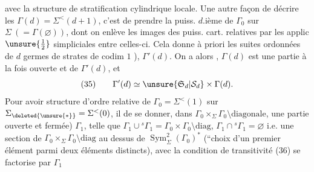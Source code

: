 avec la structure de stratification cylindrique 
locale.  Une autre façon de
décrire les $\Gamma(d)=\Sigma^{<}(d+1)$, c'est de
prendre la puiss.   $d$.ième de $\Gamma_0$\deleted{\unsure{$(\varnothing)$}}
sur $\Sigma\ (=\Gamma(\varnothing))$, dont on enlève les images
des puiss. cart. relatives   par les applic
$\unsure{\tfrac12}$ simpliciales entre celles-ci. Cela donne à priori
les  suites ordonnées de $d$ germes de
strates de codim $1$   ), 
$\Gamma'(d)$. On a alors ,
$\Gamma(d)$ est une partie à la fois ouverte et
 de $\Gamma'(d)$, et 
\[
(35)\qquad \Gamma'(d)\simeq\unsure{\mathfrak S_d|\mathcal S_d}\times\Gamma(d).
\]
Pour avoir  structure d'ordre  relative de
 $\Gamma_0=\Sigma^{<}(1)$ sur $\Sigma_{\deleted{\unsure{*}}}=\Sigma^{<}(0)$, il 
de se donner,  dans
$\Gamma_0\times_\Sigma\Gamma_0\setminus\text{diagonale}$, une partie  ouverte et fermée)
$\Gamma_1$, telle que $\Gamma_1\cup{}^s\Gamma_1=\Gamma_0\times\Gamma_0\setminus\text{diag}$, $\Gamma_1\cap{}^s\Gamma_1=\varnothing$
i.e. une section de $\Gamma_0\times_\Sigma\Gamma_0\setminus\text{diag}$ au dessus
de $\operatorname{Sym}^2_\Sigma(\Gamma_0)^*$ (``choix d'un premier élément parmi deux
éléments distincts), avec la condition de transitivité
(36) \quad se factorise par $\Gamma_1$

